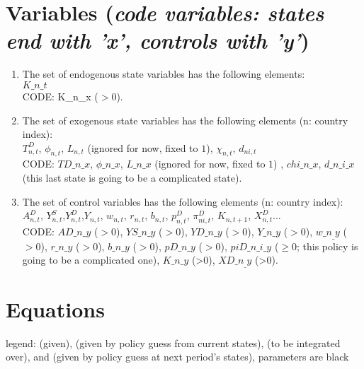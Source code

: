 \documentclass[11pt]{article}
\newcommand{\cl}[1]{{\color{orange}{#1}}}
\newcommand{\st}[1]{{\color{green}{#1}}}
\newcommand{\stnext}[1]{{\color{magenta}{#1}}}
\newcommand{\clnext}[1]{{\color{blue}{#1}}}
\begin{document}

\section{Variables (\emph{code variables: states end with 'x', controls with 'y'})}

\begin{enumerate}
	\item The set of endogenous state variables has the following elements: \\
	 $K\_n\_t$\\
	 CODE: K\_n\_x ($>0$).
	\item The set of exogenous state variables has the following elements (n: country index): \\
	 $T^D_{n,t}$, $\phi_{n,t}$, $L_{n,t}$ (ignored for now, fixed to $1$),  $\chi_{n,t}$, $d_{ni,t}$ \\
	 CODE: $TD\_n\_x$, $\phi\_n\_x$, $L\_n\_x$ (ignored for now, fixed to $1$) , $chi\_n\_x$, $d\_n\_i\_x$ (this last state is going to be a complicated state). \\
	 \item The set of control variables has the following elements (n: country index): \\
	 $A_{n, t}^{D}$, $Y^S_{n,t}$,$Y^D_{n,t}$,$Y_{n,t}$, $w_{n,t}$, $r_{n,t}$, $b_{n,t}$, $p^D_{n,t}$, $\pi^D_{ni,t}$, $K_{n,t+1}$, $X^D_{n,t}$...\\
	 CODE: $AD\_n\_y$ ($>0$), $YS\_n\_y$ ($>0$), $YD\_n\_y$ ($>0$), $Y\_n\_y$ ($>0$), 
	 $w\_n_\_y$ ($>0$), $r\_n\_y$ ($>0$), $b\_n\_y$ ($>0$), $pD\_n\_y$ ($>0$), $piD\_n\_i\_y$ ($\geq 0$; this policy is going to be a complicated one), $K\_n\_y$ (>0), $XD\_n_\_y$ (>0). \\
\end{enumerate}



\section{Equations}

legend: \st{states in green} (given), \cl{controls in orange} (given by policy guess from current states), \stnext{next period's exogenous states in magenta} (to be integrated over), and \clnext{next period's controls in blue} (given by policy guess at next period's states), parameters are black\vspace{5mm}
\end{document}
